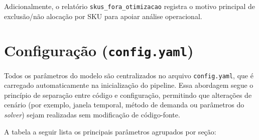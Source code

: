 \documentclass[11pt,a4paper]{article}
\begin{document}
Adicionalmente, o relatório \texttt{skus\_fora\_otimizacao} registra o motivo
principal de exclusão/não alocação por SKU para apoiar análise operacional.

\section{Configuração (\texttt{config.yaml})}

Todos os parâmetros do modelo são centralizados no arquivo
\texttt{config.yaml}, que é carregado automaticamente na inicialização do
pipeline. Essa abordagem segue o princípio de separação entre código e
configuração, permitindo que alterações de cenário (por exemplo, janela
temporal, método de demanda ou parâmetros do \textit{solver}) sejam realizadas
sem modificação de código-fonte.

A tabela a seguir lista os principais parâmetros agrupados por seção:
\end{document}
